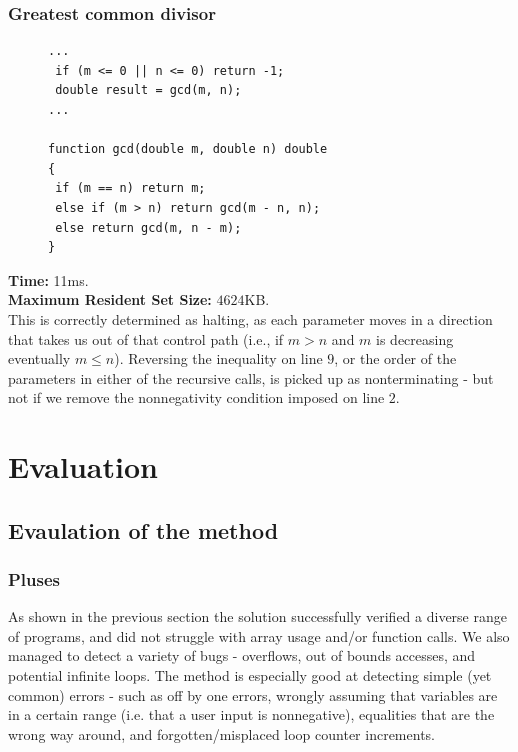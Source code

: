 \documentclass[12pt,a4paper]{article}
\begin{document}
\subsubsection{Greatest common divisor}
\begin{minipage}{\textwidth}
\begin{figure}
\centering
\begin{lstlisting}[frame=tlrb,language=myLang]
...
 if (m <= 0 || n <= 0) return -1;
 double result = gcd(m, n);
...

function gcd(double m, double n) double
{
 if (m == n) return m;
 else if (m > n) return gcd(m - n, n);
 else return gcd(m, n - m);
}
\end{lstlisting}
\end{figure}
\textbf{Time:} 11ms.\\
{\textbf{Maximum Resident Set Size:} $4624$KB.}\\
This is correctly determined as halting, as each parameter moves in a direction that takes us out of that control path (i.e., if $m > n$ and $m$ is decreasing eventually $m \leq n$).
Reversing the inequality on line $9$, or the order of the parameters in either of the recursive calls, is picked up as nonterminating - but not if we remove the nonnegativity condition
imposed on line $2$. 
\end{minipage}
\newpage
\begin{minipage}{\textwidth}
\section{Evaluation}
\end{minipage}
\subsection{Evaulation of the method}
\subsubsection{Pluses}
As shown in the previous section the solution successfully verified a diverse range of programs, and did not struggle with array usage and/or function calls.
We also managed to detect a variety of bugs - overflows, out of bounds accesses, and potential infinite loops. The method is especially good at detecting simple (yet common) errors - such as off by one errors, wrongly assuming that variables are in a certain range
(i.e. that a user input is nonnegative), equalities that are the wrong way around, and forgotten/misplaced loop counter increments.
\end{document}
